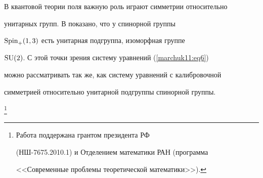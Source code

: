 В квантовой теории поля важную роль играют симметрии относительно

унитарных групп. В \cite{marchuk11:2} показано,  что у спинорной группы

${\rm Spin}_+(1, 3)$ есть унитарная подгруппа,  изоморфная группе

${\rm SU}(2)$. С этой точки зрения систему уравнений (\ref{marchuk11:eq6})

можно рассматривать так же, как систему уравнений с калибровочной

симметрией относительно унитарной подгруппы спинорной группы.



\thanks{Работа поддержана грантом президента РФ

(НШ-7675.2010.1) и Отделением математики РАН (программа

<<Современные проблемы теоретической математики>>).}







